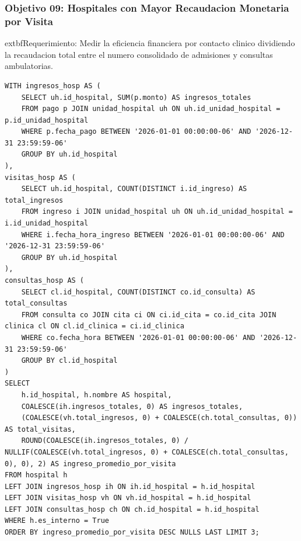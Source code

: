 \documentclass[11pt,a4paper]{article}
\begin{document}
\subsubsection{Objetivo 09: Hospitales con Mayor Recaudacion Monetaria por Visita}
	extbf{Requerimiento:} Medir la eficiencia financiera por contacto clinico dividiendo la recaudacion total entre el numero consolidado de admisiones y consultas ambulatorias.
\begin{lstlisting}[style=sqlstyle]
WITH ingresos_hosp AS (
    SELECT uh.id_hospital, SUM(p.monto) AS ingresos_totales
    FROM pago p JOIN unidad_hospital uh ON uh.id_unidad_hospital = p.id_unidad_hospital
    WHERE p.fecha_pago BETWEEN '2026-01-01 00:00:00-06' AND '2026-12-31 23:59:59-06'
    GROUP BY uh.id_hospital
),
visitas_hosp AS (
    SELECT uh.id_hospital, COUNT(DISTINCT i.id_ingreso) AS total_ingresos
    FROM ingreso i JOIN unidad_hospital uh ON uh.id_unidad_hospital = i.id_unidad_hospital
    WHERE i.fecha_hora_ingreso BETWEEN '2026-01-01 00:00:00-06' AND '2026-12-31 23:59:59-06'
    GROUP BY uh.id_hospital
),
consultas_hosp AS (
    SELECT cl.id_hospital, COUNT(DISTINCT co.id_consulta) AS total_consultas
    FROM consulta co JOIN cita ci ON ci.id_cita = co.id_cita JOIN clinica cl ON cl.id_clinica = ci.id_clinica
    WHERE co.fecha_hora BETWEEN '2026-01-01 00:00:00-06' AND '2026-12-31 23:59:59-06'
    GROUP BY cl.id_hospital
)
SELECT 
    h.id_hospital, h.nombre AS hospital,
    COALESCE(ih.ingresos_totales, 0) AS ingresos_totales,
    (COALESCE(vh.total_ingresos, 0) + COALESCE(ch.total_consultas, 0)) AS total_visitas,
    ROUND(COALESCE(ih.ingresos_totales, 0) / NULLIF(COALESCE(vh.total_ingresos, 0) + COALESCE(ch.total_consultas, 0), 0), 2) AS ingreso_promedio_por_visita
FROM hospital h
LEFT JOIN ingresos_hosp ih ON ih.id_hospital = h.id_hospital
LEFT JOIN visitas_hosp vh ON vh.id_hospital = h.id_hospital
LEFT JOIN consultas_hosp ch ON ch.id_hospital = h.id_hospital
WHERE h.es_interno = True
ORDER BY ingreso_promedio_por_visita DESC NULLS LAST LIMIT 3;
\end{lstlisting}
\end{document}
